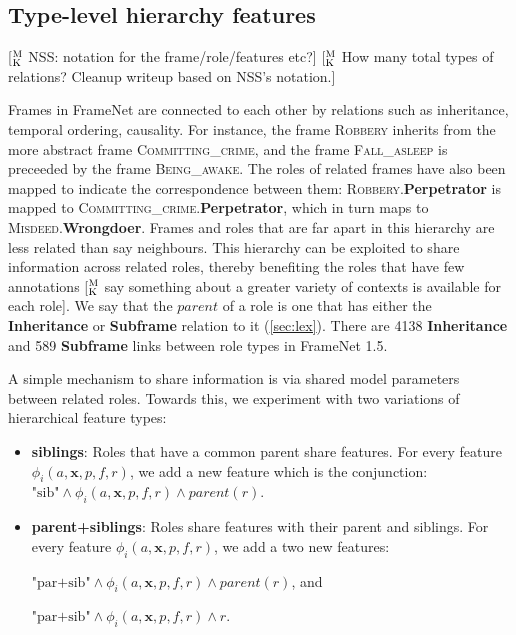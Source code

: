 \documentclass[11pt,a4paper]{article}
\newcommand{\ensuretext}[1]{#1}
\newcommand{\mkmarker}{\ensuretext{\textcolor{mdgreen}{\ensuremath{^{\textsc{M}}_{\textsc{K}}}}}}
\newcommand{\arkcomment}[3]{\ensuretext{\textcolor{#3}{[#1 #2]}}}
\newcommand{\mk}[1]{\arkcomment{\mkmarker}{#1}{mdgreen}}
\newcommand{\fnf}[1]{\textsc{\textsf{#1}}} %
\newcommand{\fnr}[1]{\textbf{\textsf{#1}}} %
\begin{document}
\subsection{Type-level hierarchy features}\label{sec:hierfeats}
\mk{NSS: notation for the frame/role/features etc?}
\mk{How many total types of relations? Cleanup writeup based on NSS's notation.}

Frames in FrameNet are connected to each other by relations such as inheritance, temporal ordering, causality. 
For instance, the frame \fnf{Robbery} inherits from the more abstract frame \fnf{Committing\_crime}, and the
frame \fnf{Fall\_asleep} is preceeded by the frame \fnf{Being\_awake}. The roles of related frames have 
also been mapped to indicate the correspondence between them: \fnf{Robbery}.\fnr{Perpetrator} is mapped to 
\fnf{Committing\_crime}.\fnr{Perpetrator}, which in turn maps to \fnf{Misdeed}.\fnr{Wrongdoer}. Frames and roles that are far
apart in this hierarchy are less related than say neighbours.
This hierarchy can be exploited to share information across related roles, thereby benefiting the roles 
that have few annotations \mk{say something about a greater variety of contexts is available for each role}. 
We say that the $\textit{parent}$ of a role is one that has either the \textbf{Inheritance} or \textbf{Subframe} relation to it (\cref{sec:lex}).
There are 4138 \textbf{Inheritance} and 589 \textbf{Subframe} links between role types in FrameNet 1.5.

A simple mechanism to share information is via shared model parameters between related roles. Towards this, we experiment with two variations of
hierarchical feature types:

\begin{itemize}
  \item 
\noindent\textbf{siblings}: Roles that have a common parent share features.
For every feature $\phi_i(a, \mathbf{x}, p, f, r)$, we add a new feature which is the conjunction: 
$\text{"sib"} \wedge \phi_i(a, \mathbf{x}, p, f, r) \wedge \textit{parent}(r)$. 

  \item\noindent\textbf{parent+siblings}: Roles share features with their parent and siblings. 
For every feature $\phi_i(a, \mathbf{x}, p, f, r)$, we add a two new features:

\noindent$\text{"par+sib"} \wedge \phi_i(a, \mathbf{x}, p, f, r) \wedge \textit{parent}(r)$, and

\noindent$\text{"par+sib"} \wedge \phi_i(a, \mathbf{x}, p, f, r) \wedge r$.
\end{itemize}
\end{document}

